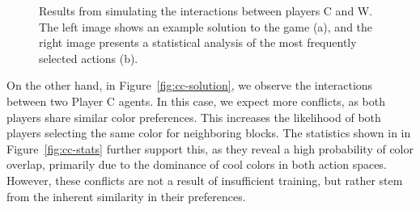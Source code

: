 \begin{figure}[H]
\begin{subfigure}[b]{0.45\textwidth}
                \caption{}
                \label{fig:cw-stats}
            \end{subfigure}
            \caption{Results from simulating the interactions between players C and W. The left image shows an example solution to the game (a), and the right image presents a statistical analysis of the most frequently selected actions (b).}
            \label{fig:cw-simulation}
        \end{figure}

        \noindent
        On the other hand, in Figure~\ref{fig:cc-solution}, we observe the interactions between two Player C agents. In this case, we expect more conflicts, as both players share similar color preferences. This increases the likelihood of both players selecting the same color for neighboring blocks. The statistics shown in in Figure~\ref{fig:cc-stats} further support this, as they reveal a high probability of color overlap, primarily due to the dominance of cool colors in both action spaces. However, these conflicts are not a result of insufficient training, but rather stem from the inherent similarity in their preferences.
